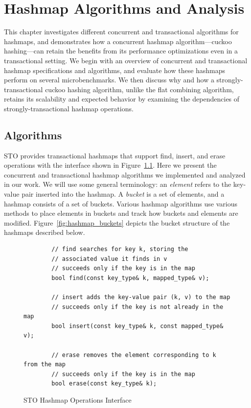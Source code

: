 \chapter{Hashmap Algorithms and Analysis}
\label{hashmap}

This chapter investigates different concurrent and transactional algorithms for hashmaps, and demonstrates how a concurrent hashmap algorithm---cuckoo hashing---can retain the benefits from its performance optimizations even in a transactional setting. We begin with an overview of concurrent and transactional hashmap specifications and algorithms, and evaluate how these hashmaps perform on several microbenchmarks. We then discuss why and how a strongly-transactional cuckoo hashing algorithm, unlike the flat combining algorithm, retains its scalability and expected behavior by examining the dependencies of strongly-transactional hashmap operations.

\section{Algorithms}

STO provides transactional hashmaps that support find, insert, and erase operations with the interface shown in Figure~\ref{fig:hm_interface}. 
Here we present the concurrent and transactional hashmap algorithms we implemented and analyzed in our work. We will use some general terminology: an \emph{element} refers to the key-value pair inserted into the hashmap. A \emph{bucket} is a set of elements, and a hashmap consists of a set of buckets. Various hashmap algorithms use various methods to place elements in buckets and track how buckets and elements are modified. Figure~\ref{fig:hashmap_buckets} depicts the bucket structure of the hashmaps described below.

\begin{figure}[t]
    \centering
    \begin{lstlisting}
        // find searches for key k, storing the 
        // associated value it finds in v
        // succeeds only if the key is in the map
        bool find(const key_type& k, mapped_type& v); 
       
        // insert adds the key-value pair (k, v) to the map
        // succeeds only if the key is not already in the map
        bool insert(const key_type& k, const mapped_type& v); 

        // erase removes the element corresponding to k from the map
        // succeeds only if the key is in the map
        bool erase(const key_type& k); 
    \end{lstlisting}
    \caption{STO Hashmap Operations Interface}
    \label{fig:hm_interface}
\end{figure}


